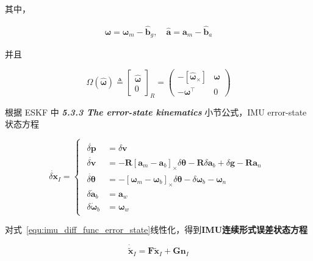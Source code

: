 \documentclass[12pt,a4paper]{article}
\begin{document}
其中，

\begin{equation*}
\begin{aligned}
\hat{\boldsymbol{\omega}} = \boldsymbol{\omega}_m - \hat{\mathbf{b}}_g, \quad
\hat{\mathbf{a}} = \mathbf{a}_m - \hat{\mathbf{b}}_a
\end{aligned}
\end{equation*}

并且

\begin{equation*}
\Omega\left(\hat{\boldsymbol{\omega}}\right) 
\triangleq 
{\begin{bmatrix}
\hat{\boldsymbol{\omega}} \\ 0
\end{bmatrix}}_R
= 
\begin{pmatrix}
-[\hat{\boldsymbol{\omega}}_\times] & \boldsymbol{\omega} \\
-\boldsymbol{\omega}^\top & 0
\end{pmatrix}
\end{equation*}

根据 \cite{DBLP:journals/corr/abs-1711-02508} ESKF 中 \textit{\textbf{5.3.3 The error-state kinematics}} 小节公式，IMU error-state状态方程

\begin{equation}
\label{equ:imu_diff_func_error_state}
\dot{\delta \mathbf{x}}_{I} = 
\begin{cases}
\begin{aligned}
\dot{\delta \mathbf{p}} &= \delta \mathbf{v} \\
\dot{\delta \mathbf{v}} &= -\mathbf{R}\left[\mathbf{a}_{m}-\mathbf{a}_{b}\right]_{ \times} \delta \boldsymbol{\theta}-\mathbf{R} \delta \mathbf{a}_{b}+\delta \mathbf{g}-\mathbf{R} \mathbf{a}_{n} \\
\dot{\delta \boldsymbol{\theta}} &= -\left[\boldsymbol{\omega}_{m}-\boldsymbol{\omega}_{b}\right]_{ \times} \delta \boldsymbol{\theta}-\delta \boldsymbol{\omega}_{b}-\boldsymbol{\omega}_{n} \\
\delta \dot{\mathbf{a}}_{b} &= \mathbf{a}_{w} \\ 
\delta \dot{\boldsymbol{\omega}}_{b} &= \boldsymbol{\omega}_{w}
\end{aligned}
\end{cases}
\end{equation}

对式~\eqref{equ:imu_diff_func_error_state}线性化，得到\textbf{IMU连续形式误差状态方程}

\begin{equation}
\dot{\tilde{\mathbf{x}}}_I = 
\mathbf{F} \tilde{\mathbf{x}}_I + 
\mathbf{G} \mathbf{n}_I
\end{equation}
\end{document}

